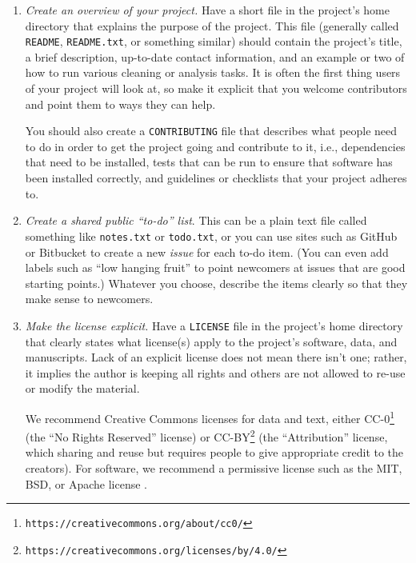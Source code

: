 \documentclass[10pt]{article}
\newcommand{\recommend}[1]{\textit{#1}}
\newcommand{\withurl}[2]{{#1}\footnote{\texttt{#2}}}
\begin{document}
\begin{enumerate}

\item
  \recommend{Create an overview of your project.}  Have a short
  file in the project's home directory that explains the
  purpose of the project.  This file (generally called
  \texttt{README}, \texttt{README.txt}, or something similar) should
  contain the project's title, a brief description, up-to-date contact
  information, and
  an example or two of how to run various cleaning or analysis tasks.  It is often
  the first thing users of your project will look at, so make it
  explicit that you welcome contributors and point them to ways they
  can help.

  You should also create a \texttt{CONTRIBUTING} file that describes
  what people need to do in order to get the project going and
  contribute to it, i.e., dependencies that need to be installed,
  tests that can be run to ensure that software has been installed
  correctly, and guidelines or checklists that your project adheres
  to.

\item
  \recommend{Create a shared public ``to-do'' list}.  This can be a
  plain text file called something like \texttt{notes.txt} or
  \texttt{todo.txt}, or you can use sites such as GitHub or Bitbucket
  to create a new \emph{issue} for each to-do item. (You can even add
  labels such as ``low hanging fruit'' to point newcomers at issues
  that are good starting points.)  Whatever you choose, describe the
  items clearly so that they make sense to newcomers.

\item
  \recommend{Make the license explicit.}  Have a \texttt{LICENSE} file
  in the project's home directory that clearly states what license(s)
  apply to the project's software, data, and manuscripts. Lack of an
  explicit license does not mean there isn't one; rather, it implies
  the author is keeping all rights and others are not allowed to
  re-use or modify the material.

  We recommend Creative Commons licenses for data and text, either
  \withurl{CC-0}{https://creativecommons.org/about/cc0/} (the ``No
  Rights Reserved'' license) or
  \withurl{CC-BY}{https://creativecommons.org/licenses/by/4.0/} (the
  ``Attribution'' license, which sharing and reuse but requires people
  to give appropriate credit to the creators).  For software, we
  recommend a permissive license such as the MIT, BSD, or Apache
  license \cite{laurent2004}.


\end{enumerate}
\end{document}
